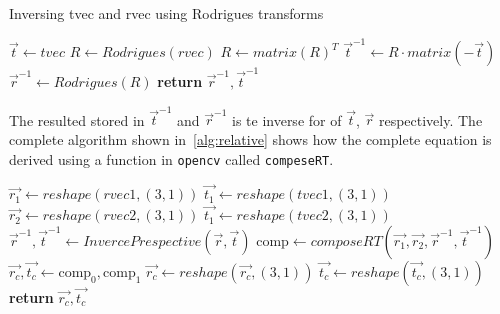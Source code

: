 \begin{algorithm}
    \caption{Inversing tvec and rvec using Rodrigues transforms}\label{alg:inverse}
    \begin{algorithmic}[1]
        \State $\vec{t} \gets tvec$
        \State $R \gets Rodrigues(rvec)$ 
        \State $R \gets matrix(R)^{T}$ 
        \State $\vec{t}^{-1} \gets R \cdot matrix(-\vec{t})$ 
        \State $\vec{r}^{-1} \gets Rodrigues(R)$ 
        \State \textbf{return} $\vec{r}^{-1}, \vec{t}^{-1}$ 
        \EndProcedure
    \end{algorithmic}
\end{algorithm}
The resulted stored in $\vec{t}^{-1}$ and $\vec{r}^{-1}$ is te inverse for of $\vec{t}$, $\vec{r}$ respectively.
The complete algorithm shown in~\ref{alg:relative} shows how the complete equation is derived using a function in \verb|opencv| called \verb|compeseRT|.

\begin{algorithm}
    \begin{algorithmic}[1]
        \State $\vec{r_1} \gets reshape(rvec1, (3,1))$ 
        \State $\vec{t_1} \gets reshape(tvec1, (3,1))$
        \State $\vec{r_2} \gets reshape(rvec2, (3,1))$
        \State $\vec{t_1} \gets reshape(tvec2, (3,1))$
        \State $\vec{r}^{-1}, \vec{t}^{-1} \gets InvercePrespective(\vec{r}, \vec{t})$
        \State $\text{comp} \gets composeRT(\vec{r_1}, \vec{r_2}, \vec{r}^{-1}, \vec{t}^{-1})$
            \State \( \vec{r_{c}},\vec{t_{c}}\gets\text{comp}_{0},\text{comp}_{1}\)
        \State $\vec{r_{c}} \gets reshape(\vec{r_{c}}, (3,1))$
        \State $\vec{t_{c}} \gets reshape(\vec{t_{c}}, (3,1))$
        \State \textbf{return} $\vec{r_{c}},\vec{t_{c}}$
        \EndProcedure
    \end{algorithmic}
    \caption[Relative]{
    Relative position using \textbf{composeRT}, part of \textbf{OpenCV} and the \textbf{invercePrespective} algorithm proposed in Algorithm~\ref{alg:inverse}%
    }
    \label{alg:relative}
\end{algorithm}


